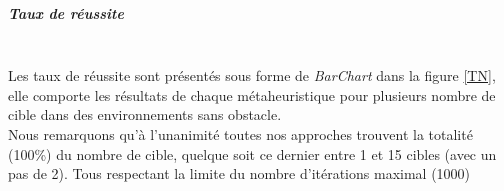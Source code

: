 %		

\noindent
\begin{minipage}[t]{0.50\textwidth}
	\subparagraph{Taux de réussite}
	\textbf{}\\
	
	Les taux de réussite sont présentés sous forme de \textit{BarChart} dans la figure \ref{TN}, elle comporte les résultats de chaque métaheuristique pour plusieurs nombre de cible dans des environnements sans obstacle.\\
	
	Nous remarquons qu'à l'unanimité toutes nos approches trouvent la totalité (100\%) du nombre de cible, quelque soit ce dernier entre 1 et 15 cibles (avec un pas de 2).
	Tous respectant la limite du nombre d'itérations maximal (1000)
\end{minipage}\hfill
\begin{minipage}[t]{0.55\textwidth}
	\captionsetup{width=0.8\linewidth}
	\centering{}
	\label{TN}
\end{minipage}\hfill




